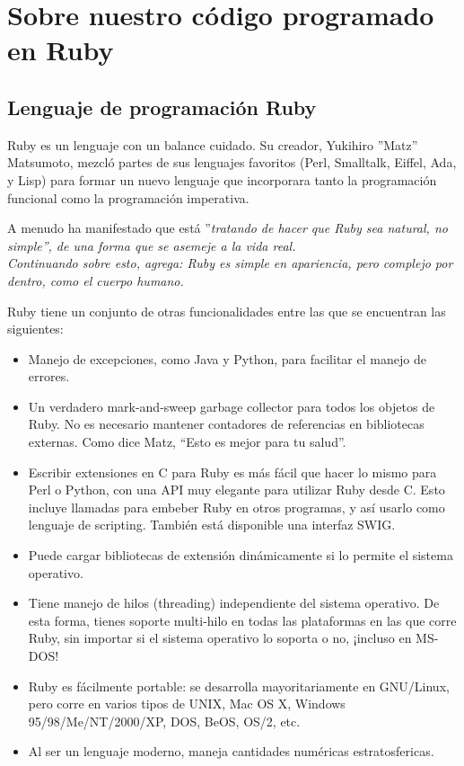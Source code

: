 
\section{Sobre nuestro código programado en Ruby}

\subsection{Lenguaje de programación Ruby}

Ruby es un lenguaje con un balance cuidado. Su creador, Yukihiro ''Matz'' Matsumoto, mezcló partes de sus lenguajes favoritos (Perl, Smalltalk, Eiffel, Ada, y Lisp) para formar un nuevo lenguaje que incorporara tanto la programación funcional como la programación imperativa.

A menudo ha manifestado que está ''\em{tratando de hacer que Ruby sea natural, no simple}'', de una forma que se asemeje a la vida real.\\
Continuando sobre esto, agrega: \em{Ruby es simple en apariencia, pero complejo por dentro, como el cuerpo humano}.

Ruby tiene un conjunto de otras funcionalidades entre las que se encuentran las siguientes:

\begin{itemize}
\item Manejo de excepciones, como Java y Python, para facilitar el manejo de errores.
\item Un verdadero mark-and-sweep garbage collector para todos los objetos de Ruby. No es necesario mantener contadores de referencias en bibliotecas externas. Como dice Matz, “Esto es mejor para tu salud”.
\item Escribir extensiones en C para Ruby es más fácil que hacer lo mismo para Perl o Python, con una API muy elegante para utilizar Ruby desde C. Esto incluye llamadas para embeber Ruby en otros programas, y así usarlo como lenguaje de scripting. También está disponible una interfaz SWIG.
\item Puede cargar bibliotecas de extensión dinámicamente si lo permite el sistema operativo.
\item Tiene manejo de hilos (threading) independiente del sistema operativo. De esta forma, tienes soporte multi-hilo en todas las plataformas en las que corre Ruby, sin importar si el sistema operativo lo soporta o no, ¡incluso en MS-DOS!
\item Ruby es fácilmente portable: se desarrolla mayoritariamente en GNU/Linux, pero corre en varios tipos de UNIX, Mac OS X, Windows 95/98/Me/NT/2000/XP, DOS, BeOS, OS/2, etc.
\item Al ser un lenguaje moderno, maneja cantidades numéricas estratosfericas.
\end{itemize}




